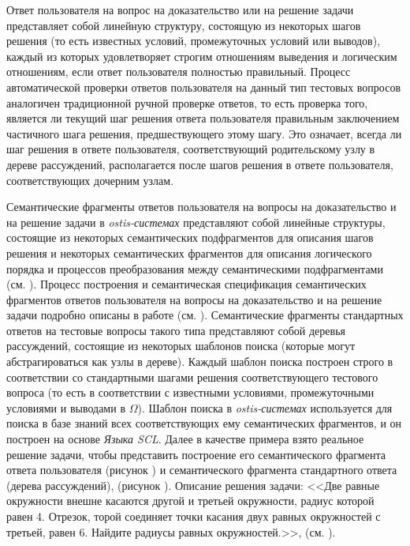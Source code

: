 Ответ пользователя на вопрос на доказательство или на решение задачи представляет собой линейную структуру, состоящую из некоторых шагов решения (то есть известных условий, промежуточных условий или выводов), каждый из которых удовлетворяет строгим отношениям выведения и логическим отношениям, если ответ пользователя полностью правильный. Процесс автоматической проверки ответов пользователя на данный тип тестовых вопросов аналогичен традиционной ручной проверке ответов, то есть проверка того, является ли текущий шаг решения ответа пользователя правильным заключением частичного шага решения, предшествующего этому шагу. Это означает, всегда ли шаг решения в ответе пользователя, соответствующий родительскому узлу в дереве рассуждений, располагается после шагов решения в ответе пользователя, соответствующих дочерним узлам.

Семантические фрагменты ответов пользователя на вопросы на доказательство и на решение задачи в \textit{ostis-системах} представляют собой линейные структуры, состоящие из некоторых семантических подфрагментов для описания шагов решения и некоторых семантических фрагментов для описания логического порядка и процессов преобразования между семантическими подфрагментами (см. ). Процесс построения и семантическая спецификация семантических фрагментов ответов пользователя на вопросы на доказательство и на решение задачи подробно описаны в работе (см. ). Семантические фрагменты стандартных ответов на тестовые вопросы такого типа представляют собой деревья рассуждений, состоящие из некоторых шаблонов поиска (которые могут абстрагироваться как узлы в дереве). Каждый шаблон поиска построен строго в соответствии со стандартными шагами решения соответствующего тестового вопроса (то есть в соответствии с известными условиями, промежуточными условиями и выводами в $\Omega $). Шаблон поиска в \textit{ostis-системах} используется для поиска в базе знаний всех соответствующих ему семантических фрагментов, и он построен на основе \textit{Языка SCL}. Далее в качестве примера взято реальное решение задачи, чтобы представить построение его семантического фрагмента ответа пользователя (рисунок \textit{}) и семантического фрагмента стандартного ответа (дерева рассуждений), (рисунок \textit{}). Описание решения задачи: <<Две равные окружности внешне касаются другой и третьей окружности, радиус которой равен 4. Отрезок, торой соединяет точки касания двух равных окружностей с третьей, равен 6. Найдите радиусы равных окружностей.>>, (см.  \textit{}).

